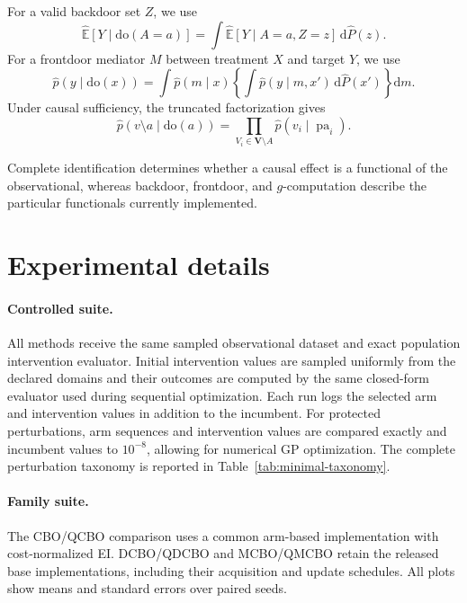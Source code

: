 \documentclass[twoside]{article}
\newcommand{\E}{\mathbb{E}}
\newcommand{\doo}{\mathrm{do}}
\begin{document}
For a valid backdoor set $Z$, we use
\[
  \widehat{\E}[Y\mid\doo(A=a)]
  =
  \int
  \widehat{\E}[Y\mid A=a,Z=z]
  \,\mathrm d\widehat P(z).
\]
For a frontdoor mediator $M$ between treatment $X$ and target $Y$, we use
\[
  \widehat p(y\mid\doo(x))
  =
  \int \widehat p(m\mid x)
  \left\{
    \int \widehat p(y\mid m,x')
    \,\mathrm d\widehat P(x')
  \right\}
  \mathrm dm.
\]
Under causal sufficiency, the truncated factorization gives
\[
  \widehat p(v\setminus a\mid\doo(a))
  =
  \prod_{V_i\in\mathbf V\setminus A}
  \widehat p(v_i\mid\operatorname{pa}_i).
\]


Complete identification determines whether a causal effect is a functional of the observational, whereas backdoor, frontdoor, and $g$-computation describe the particular functionals currently implemented.

\section{Experimental details}
\label{app:additional-results}

\paragraph{Controlled suite.}
All methods receive the same sampled observational dataset and exact population intervention evaluator. Initial intervention values are sampled uniformly from the declared domains and their outcomes are computed by the same closed-form evaluator used during sequential optimization. Each run logs the selected arm and intervention values in addition to the incumbent. For protected perturbations, arm sequences and intervention values are compared exactly and incumbent values to $10^{-8}$, allowing for numerical GP optimization. The complete perturbation taxonomy is reported in Table~\ref{tab:minimal-taxonomy}.

\begin{table}[H]
  \centering
  \caption{Controlled misspecifications and measured paired trajectory
  deviations. Rows whose quotient is unchanged are predicted invariant by
  Proposition~\ref{prop:contract}.}
  \label{tab:minimal-taxonomy}
  \small
\end{table}

\paragraph{Family suite.}
The CBO/QCBO comparison uses a common arm-based implementation with cost-normalized EI. DCBO/QDCBO and MCBO/QMCBO retain the released base implementations, including their acquisition and update schedules. All plots show means and standard errors over paired seeds.
\end{document}
